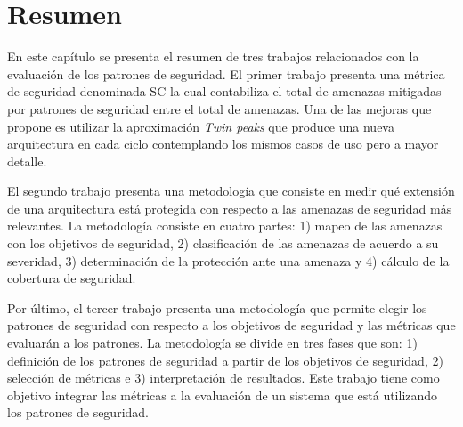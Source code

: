 %
%
%
%
\section{Resumen}

En este capítulo se presenta el resumen de tres trabajos relacionados con la evaluación de los patrones de seguridad. El primer trabajo presenta una métrica de seguridad denominada SC la cual contabiliza el total de amenazas mitigadas por patrones de seguridad entre el total de amenazas. Una de las mejoras que propone es utilizar la aproximación \textit{Twin peaks} que produce una nueva arquitectura en cada ciclo contemplando los mismos casos de uso pero a mayor detalle.

\vspace{0.3cm}

El segundo trabajo presenta una metodología que consiste en medir qué extensión de una arquitectura está protegida con respecto a las amenazas de seguridad más relevantes. La metodología consiste en cuatro partes: 1) mapeo de las amenazas con los objetivos de seguridad, 2) clasificación de las amenazas de acuerdo a su severidad, 3) determinación de la protección ante una amenaza y 4) cálculo de la cobertura de seguridad. 

\vspace{0.3cm}

Por último, el tercer trabajo presenta una metodología que permite elegir los patrones de seguridad con respecto a los objetivos de seguridad y las métricas que evaluarán a los patrones. La metodología se divide en tres fases que son: 1) definición de los patrones de seguridad a partir de los objetivos de seguridad, 2) selección de métricas e 3) interpretación de resultados. Este trabajo tiene como objetivo integrar las métricas a la evaluación de un sistema que está utilizando los patrones de seguridad. 